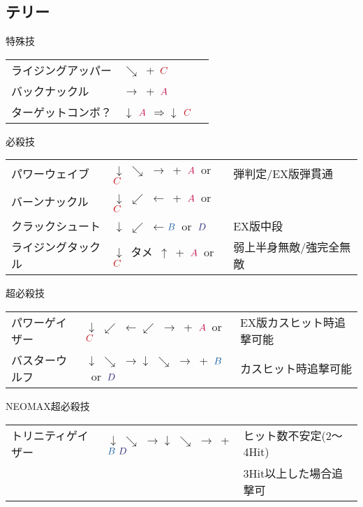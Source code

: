 \documentclass[a4j,11pt]{jarticle}
\def\A{\textcolor{Acolor}{A}}
\def\C{\textcolor{Ccolor}{C}}
\def\B{\textcolor{Bcolor}{B}}
\def\D{\textcolor{Dcolor}{D}}
\def\hado{$\downarrow$ $\searrow$ $\rightarrow$}%
\def\tatsu{$\downarrow$ $\swarrow$ $\leftarrow$}%
\def\Cancel{$\Longrightarrow$}
\begin{document}
\subsection{テリー}
\begin{itembox}[l]{特殊技}
\begin{tabular}{lll}
ライジングアッパー&$\searrow$\ +\ $\C$&\\
バックナックル&$\rightarrow$\ +\ $\A$&\\
ターゲットコンボ？&$\downarrow$ $\A$ \Cancel $\downarrow$ $\C$
\end{tabular}
\end{itembox}
\begin{itembox}[l]{必殺技}
\begin{tabular}{lll}
パワーウェイブ&\hado\ +\ $\A$\ or\ $\C$&弾判定/EX版弾貫通\\
バーンナックル&\tatsu\ +\ $\A$\ or\ $\C$&\\
クラックシュート&\tatsu $\B$\ or\ $\D$&EX版中段\\
ライジングタックル&$\downarrow$\ タメ\ $\uparrow$\ +\ $\A$\ or\ $\C$&弱上半身無敵/強完全無敵
\end{tabular}
\end{itembox}
\begin{itembox}[l]{超必殺技}
\begin{tabular}{lll}
パワーゲイザー&\tatsu $\swarrow$ $\rightarrow$\ +\ $\A$\ or\ $\C$&EX版カスヒット時追撃可能\\
バスターウルフ&\hado\hado\ +\ $\B$\ or\ $\D$&カスヒット時追撃可能
\end{tabular}
\end{itembox}
\begin{itembox}[l]{NEOMAX超必殺技}
\begin{tabular}{lll}
トリニティゲイザー&\hado\hado\ +$\B\ \D$&ヒット数不安定(2～4Hit)\\
&&3Hit以上した場合追撃可
\end{tabular}
\end{itembox}
\newpage
\end{document}
